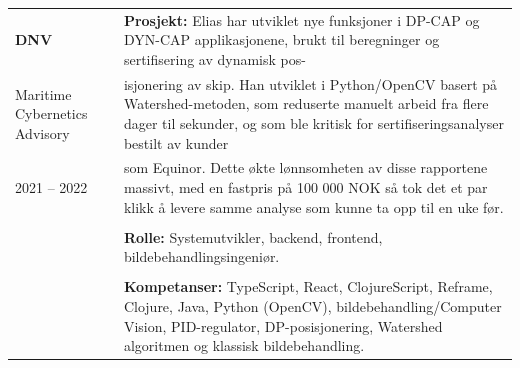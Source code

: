 \documentclass[a4paper,10pt]{article}
\begin{document}
 
\vspace{2em}

\noindent
\begin{tabular}{@{}p{4cm}p{11cm}@{}}  %
\textbf{DNV} 
& \textbf{Prosjekt:} Elias har utviklet nye funksjoner i DP-CAP og DYN-CAP applikasjonene, brukt til beregninger og sertifisering av dynamisk pos-\\
Maritime Cybernetics Advisory & isjonering av skip. Han utviklet i Python/OpenCV basert på Watershed-metoden, som reduserte manuelt arbeid fra flere dager til sekunder, og som ble kritisk for sertifiseringsanalyser bestilt av kunder\\
2021 -- 2022 & som Equinor. Dette økte lønnsomheten av disse rapportene massivt, med en fastpris på 100 000 NOK så tok det et par klikk å levere samme analyse som kunne ta opp til en uke før. \\
& \\
& \textbf{Rolle:} Systemutvikler, backend, frontend, bildebehandlingsingeniør. \\
& \\
& \textbf{Kompetanser:} TypeScript, React, ClojureScript, Reframe, Clojure, Java, Python (OpenCV), bildebehandling/Computer Vision, PID-regulator, DP-posisjonering, Watershed algoritmen og klassisk bildebehandling. \\
\end{tabular}
 


 
\end{document}
